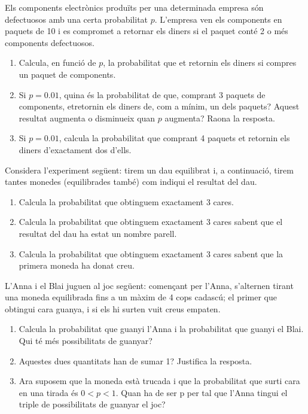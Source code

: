 \item Els components electrònics produïts per una determinada empresa són defectuosos amb una certa probabilitat $p$. L'empresa ven els components en paquets de 10 i es compromet a retornar els diners si el paquet conté 2 o més components defectuosos.
\begin{enumerate}
    \item Calcula, en funció de $p$, la probabilitat que et retornin els diners si compres un paquet de components.
    \item Si $p=0.01$, quina és la probabilitat de que, comprant 3 paquets de components, etretornin els diners de, com a mínim, un dels paquets? Aquest resultat augmenta o disminueix quan $p$ augmenta? Raona la resposta.
    \item Si $p=0.01$, calcula la probabilitat que comprant 4 paquets et retornin els diners d'exactament dos d'ells.
\end{enumerate}

\item Considera l'experiment següent: tirem un dau equilibrat i, a continuació, tirem tantes monedes (equilibrades també) com indiqui el resultat del dau.
\begin{enumerate}
    \item Calcula la probabilitat que obtinguem exactament 3 cares.
    \item Calcula la probabilitat que obtinguem exactament 3 cares sabent que el resultat del dau ha estat un nombre parell.
    \item Calcula la probabilitat que obtinguem exactament 3 cares sabent que la primera moneda ha donat creu.
\end{enumerate}

\item L'Anna i el Blai juguen al joc següent: començant per l'Anna, s'alternen tirant una moneda equilibrada fins a un màxim de 4 cops cadascú; el primer que obtingui cara guanya, i si els hi surten vuit creus empaten.
\begin{enumerate}
    \item Calcula la probabilitat que guanyi l'Anna i la probabilitat que guanyi el Blai. Qui té més possibilitats de guanyar?
    \item Aquestes dues quantitats han de sumar 1? Justifica la resposta.
    \item Ara suposem que la moneda està trucada i que la probabilitat que surti cara en una tirada és $0<p<1$. Quan ha de ser p per tal que l'Anna tingui el triple de possibilitats de guanyar el joc?
\end{enumerate}

